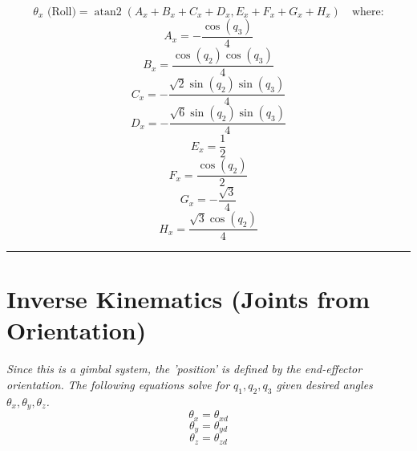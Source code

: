 \documentclass[11pt, a4paper]{article}
\begin{document}
\vspace{1cm}
$$ \theta_x \text{ (Roll)} = \operatorname{atan2}(A_x + B_x + C_x + D_x, E_x + F_x + G_x + H_x) \quad \text{where:}$$
\begin{dmath*} A_x = - \frac{\cos{\left(q_{3} \right)}}{4}\end{dmath*}
\begin{dmath*} B_x = \frac{\cos{\left(q_{2} \right)} \cos{\left(q_{3} \right)}}{4}\end{dmath*}
\begin{dmath*} C_x = - \frac{\sqrt{2} \sin{\left(q_{2} \right)} \sin{\left(q_{3} \right)}}{4}\end{dmath*}
\begin{dmath*} D_x = - \frac{\sqrt{6} \sin{\left(q_{2} \right)} \sin{\left(q_{3} \right)}}{4}\end{dmath*}
\begin{dmath*} E_x = \frac{1}{2}\end{dmath*}
\begin{dmath*} F_x = \frac{\cos{\left(q_{2} \right)}}{2}\end{dmath*}
\begin{dmath*} G_x = - \frac{\sqrt{3}}{4}\end{dmath*}
\begin{dmath*} H_x = \frac{\sqrt{3} \cos{\left(q_{2} \right)}}{4}\end{dmath*}

\hrule

\section*{Inverse Kinematics (Joints from Orientation)}
\textit{Since this is a gimbal system, the 'position' is defined by the end-effector orientation.}
\textit{The following equations solve for $q_1, q_2, q_3$ given desired angles $\theta_x, \theta_y, \theta_z$.}
\vspace{0.5cm}
\begin{dmath*} \theta_x = \theta_{x d}\end{dmath*}
\begin{dmath*} \theta_y = \theta_{y d}\end{dmath*}
\begin{dmath*} \theta_z = \theta_{z d}\end{dmath*}
\end{document}

